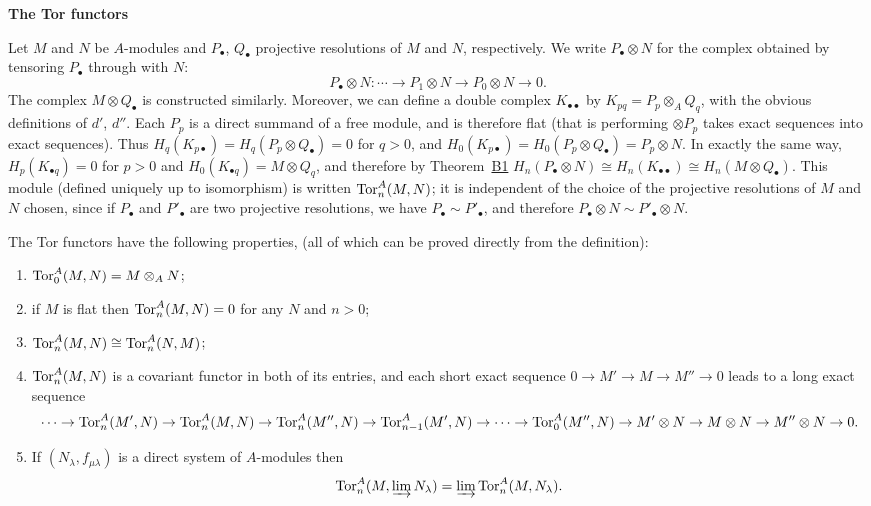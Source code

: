 \medskip
\noindent\textbf{The Tor functors}

Let $M$ and $N$ be $A$-modules and $P_\bullet$, $Q_\bullet$ projective resolutions of $M$ and
$N$, respectively. We write $P_\bullet \otimes N$ for the complex obtained by tensoring
$P_\bullet$ through with $N$:
\[
  P_\bullet \otimes N\colon \cdots \to P_1 \otimes N \to P_0 \otimes N \to 0.
\]
The complex $M \otimes Q_\bullet$ is constructed similarly. Moreover, we can define a
double complex $K_{\bullet\bullet}$ by $K_{pq} = P_p \otimes_A Q_q$, with the obvious definitions of
$d'$, $d''$. Each $P_p$ is a direct summand of a free module, and is therefore flat
(that is performing $\otimes P_p$ takes exact sequences into exact sequences). Thus
$H_q(K_{p\bullet}) = H_q(P_p \otimes Q_\bullet) = 0$ for $q > 0$, and
$H_0(K_{p\bullet}) = H_0(P_p \otimes Q_\bullet) = P_p \otimes N$. In exactly the same way,
$H_p(K_{\bullet q}) = 0$ for $p > 0$ and $H_0(K_{\bullet q}) = M \otimes Q_q$, and therefore by
Theorem~\hyperref[thm:B1]{B1} $H_n(P_\bullet \otimes N) \cong H_n(K_{\bullet\bullet}) \cong H_n(M \otimes Q_\bullet)$. This
module (defined uniquely up to isomorphism) is written $\operatorname{Tor}^A_n(M, N)$; it is
independent of the choice of the projective resolutions of $M$ and $N$ chosen,
since if $P_\bullet$ and $P'_\bullet$ are two projective resolutions, we have $P_\bullet \sim P'_\bullet$, and
therefore $P_\bullet \otimes N \sim P'_\bullet \otimes N$.

The Tor functors have the following properties, (all of which can be proved
directly from the definition):
\begin{enumerate}[(1)]
  \item $\operatorname{Tor}^A_0(M, N) = M \otimes_A N$;
  \item if $M$ is flat then $\operatorname{Tor}^A_n(M, N) = 0$ for any $N$ and $n > 0$;
  \item $\operatorname{Tor}^A_n(M, N) \cong \operatorname{Tor}^A_n(N, M)$;
  \item $\operatorname{Tor}^A_n(M, N)$ is a covariant functor in both of its entries, and each short
        exact sequence $0 \to M' \to M \to M'' \to 0$ leads to a long exact sequence
        \[
          \cdots \to \operatorname{Tor}^A_n(M', N) \to \operatorname{Tor}^A_n(M, N) \to \operatorname{Tor}^A_n(M'', N)
          \to \operatorname{Tor}^A_{n-1}(M', N) \to \cdots \to \operatorname{Tor}^A_0(M'', N)
          \to M' \otimes N \to M \otimes N \to M'' \otimes N \to 0.
        \]
  \item If $(N_\lambda, f_{\mu\lambda})$ is a direct system of $A$-modules then
        \[
          \operatorname{Tor}^A_n(M, \varinjlim N_\lambda) = \varinjlim \operatorname{Tor}^A_n(M, N_\lambda).
        \]
\end{enumerate}

